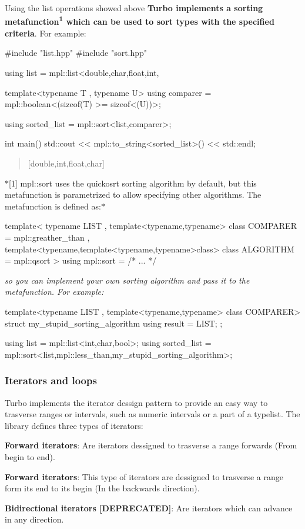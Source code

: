 Using the list operations showed above {\bfseries Turbo implements a sorting metafunction\textsuperscript{1} which can be used to sort types with the specified criteria}. For example\+: \begin{DoxyVerb}#include "list.hpp"
#include "sort.hpp"

using list = mpl::list<double,char,float,int,

template<typename T , typename U>
using comparer = mpl::boolean<(sizeof(T) >= sizeof<(U))>;

using sorted_list = mpl::sort<list,comparer>;

int main()
{
  std::cout << mpl::to_string<sorted_list>() << std::endl;
}
\end{DoxyVerb}
 \begin{quote}
\mbox{[}double,int,float,char\mbox{]} \end{quote}


$\ast$\mbox{[}1\mbox{]} {\ttfamily mpl\+::sort} uses the quickosrt sorting algorithm by default, but this metafunction is parametrized to allow specifying other algorithms. The metafunction is defined as\+:$\ast$ \begin{DoxyVerb}template<
         typename LIST , 
         template<typename,typename> class COMPARER = mpl::greather_than , 
         template<typename,template<typename,typename>class> class ALGORITHM = mpl::qsort
        >
using mpl::sort = /* ... */
\end{DoxyVerb}
 {\itshape so you can implement your own sorting algorithm and pass it to the metafunction. For example\+:} \begin{DoxyVerb} template<typename LIST , template<typename,typename> class COMPARER>
 struct my_stupid_sorting_algorithm
 {
        using result = LIST;
 };

 using list = mpl::list<int,char,bool>;
 using sorted_list = mpl::sort<list,mpl::less_than,my_stupid_sorting_algorithm>;
\end{DoxyVerb}


\subsubsection*{Iterators and loops}

Turbo implements the iterator dessign pattern to provide an easy way to trasverse ranges or intervals, such as numeric intervals or a part of a typelist. The library defines three types of iterators\+:
\begin{DoxyItemize}
\item {\bfseries Forward iterators}\+: Are iterators dessigned to trasverse a range forwards (From begin to end).
\item {\bfseries Forward iterators}\+: This type of iterators are dessigned to trasverse a range form its end to its begin (In the backwards direction).
\item {\bfseries Bidirectional iterators \mbox{[}D\+E\+P\+R\+E\+C\+A\+T\+E\+D\mbox{]}}\+: Are iterators which can advance in any direction.
\end{DoxyItemize}


